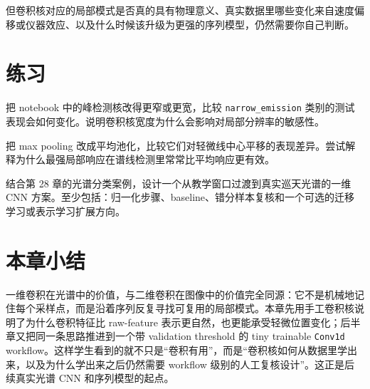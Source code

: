 但卷积核对应的局部模式是否真的具有物理意义、真实数据里哪些变化来自速度偏移或仪器效应、以及什么时候该升级为更强的序列模型，仍然需要你自己判断。

\section{练习}

\begin{exercisebox}[基础练习]
把 notebook 中的峰检测核改得更窄或更宽，比较 \texttt{narrow\_emission} 类别的测试表现会如何变化。说明卷积核宽度为什么会影响对局部分辨率的敏感性。
\end{exercisebox}

\begin{exercisebox}[进阶练习]
把 max pooling 改成平均池化，比较它们对轻微线中心平移的表现差异。尝试解释为什么最强局部响应在谱线检测里常常比平均响应更有效。
\end{exercisebox}

\begin{exercisebox}[开放练习]
结合第 28 章的光谱分类案例，设计一个从教学窗口过渡到真实巡天光谱的一维 CNN 方案。至少包括：归一化步骤、baseline、错分样本复核和一个可选的迁移学习或表示学习扩展方向。
\end{exercisebox}

\section{本章小结}

一维卷积在光谱中的价值，与二维卷积在图像中的价值完全同源：它不是机械地记住每个采样点，而是沿着序列反复寻找可复用的局部模式。本章先用手工卷积核说明了为什么卷积特征比 raw-feature 表示更自然，也更能承受轻微位置变化；后半章又把同一条思路推进到一个带 validation threshold 的 tiny trainable \texttt{Conv1d} workflow。这样学生看到的就不只是“卷积有用”，而是“卷积核如何从数据里学出来，以及为什么学出来之后仍然需要 workflow 级别的人工复核设计”。这正是后续真实光谱 CNN 和序列模型的起点。
